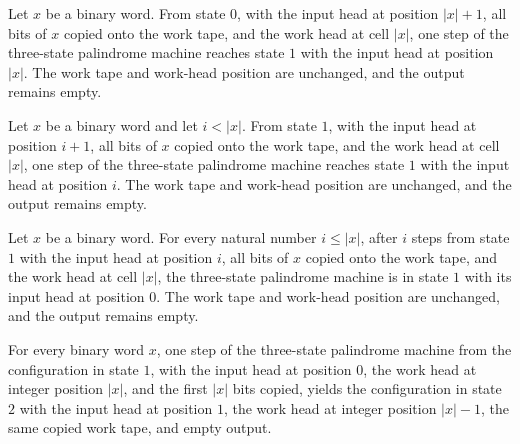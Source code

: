 \begin{lemma}
\label{Complexity.pal_copy_end}
\leanok
{}
Let $x$ be a binary word. From state $0$, with the input head at position $|x|+1$, all
bits of $x$ copied onto the work tape, and the work head at cell $|x|$, one step of the
three-state palindrome machine reaches state $1$ with the input head at position $|x|$.
The work tape and work-head position are unchanged, and the output remains empty.
\end{lemma}

\begin{lemma}
\label{Complexity.pal_rewind_step}
\leanok
{}
Let $x$ be a binary word and let $i<|x|$. From state $1$, with the input head at
position $i+1$, all bits of $x$ copied onto the work tape, and the work head at cell
$|x|$, one step of the three-state palindrome machine reaches state $1$ with the input
head at position $i$. The work tape and work-head position are unchanged, and the output
remains empty.
\end{lemma}

\begin{lemma}
\label{Complexity.pal_rewind}
\leanok
{}
Let $x$ be a binary word. For every natural number $i\le |x|$, after $i$ steps from
state $1$ with the input head at position $i$, all bits of $x$ copied onto the work
tape, and the work head at cell $|x|$, the three-state palindrome machine is in state
$1$ with its input head at position $0$. The work tape and work-head position are
unchanged, and the output remains empty.
\end{lemma}

\begin{lemma}
\label{Complexity.pal_test_start}
\leanok
{}
For every binary word $x$, one step of the three-state palindrome machine from the
configuration in state $1$, with the input head at position $0$, the work head at
integer position $|x|$, and the first $|x|$ bits copied, yields the configuration in
state $2$ with the input head at position $1$, the work head at integer position
$|x|-1$, the same copied work tape, and empty output.
\end{lemma}

